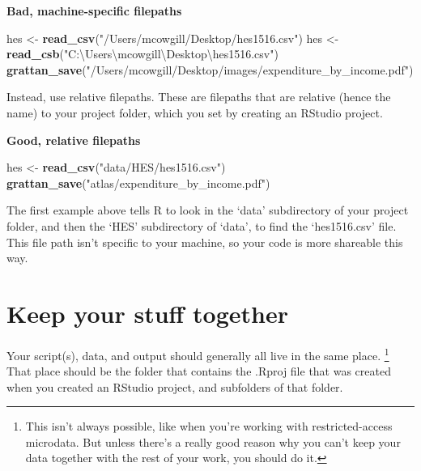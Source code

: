 \documentclass[]{book}
\newenvironment{Shaded}{\begin{snugshade}}{\end{snugshade}}
\newcommand{\KeywordTok}[1]{\textcolor[rgb]{0.13,0.29,0.53}{\textbf{#1}}}
\newcommand{\NormalTok}[1]{#1}
\newcommand{\StringTok}[1]{\textcolor[rgb]{0.31,0.60,0.02}{#1}}
\let\rmarkdownfootnote\footnote%
\def\footnote{\protect\rmarkdownfootnote}
\begin{document}
\textbf{Bad, machine-specific filepaths}

\begin{Shaded}
\begin{Highlighting}[]
\NormalTok{hes <-}\StringTok{ }\KeywordTok{read_csv}\NormalTok{(}\StringTok{"/Users/mcowgill/Desktop/hes1516.csv"}\NormalTok{)}
\NormalTok{hes <-}\StringTok{ }\KeywordTok{read_csb}\NormalTok{(}\StringTok{"C:\textbackslash{}Users\textbackslash{}mcowgill\textbackslash{}Desktop\textbackslash{}hes1516.csv"}\NormalTok{)}
\KeywordTok{grattan_save}\NormalTok{(}\StringTok{"/Users/mcowgill/Desktop/images/expenditure_by_income.pdf"}\NormalTok{)}
\end{Highlighting}
\end{Shaded}

Instead, use relative filepaths. These are filepaths that are relative (hence the name) to your project folder, which you set by creating an RStudio project.

\textbf{Good, relative filepaths}

\begin{Shaded}
\begin{Highlighting}[]
\NormalTok{hes <-}\StringTok{ }\KeywordTok{read_csv}\NormalTok{(}\StringTok{"data/HES/hes1516.csv"}\NormalTok{)}
\KeywordTok{grattan_save}\NormalTok{(}\StringTok{"atlas/expenditure_by_income.pdf"}\NormalTok{)}
\end{Highlighting}
\end{Shaded}

The first example above tells R to look in the `data' subdirectory of your project folder, and then the `HES' subdirectory of `data', to find the `hes1516.csv' file. This file path isn't specific to your machine, so your code is more shareable this way.

\hypertarget{keep-your-stuff-together}{%
\section{Keep your stuff together}\label{keep-your-stuff-together}}

Your script(s), data, and output should generally all live in the same place. \footnote{This isn't always possible, like when you're working with restricted-access microdata. But unless there's a really good reason why you can't keep your data together with the rest of your work, you should do it.} That place should be the folder that contains the .Rproj file that was created when you created an RStudio project, and subfolders of that folder.
\end{document}
